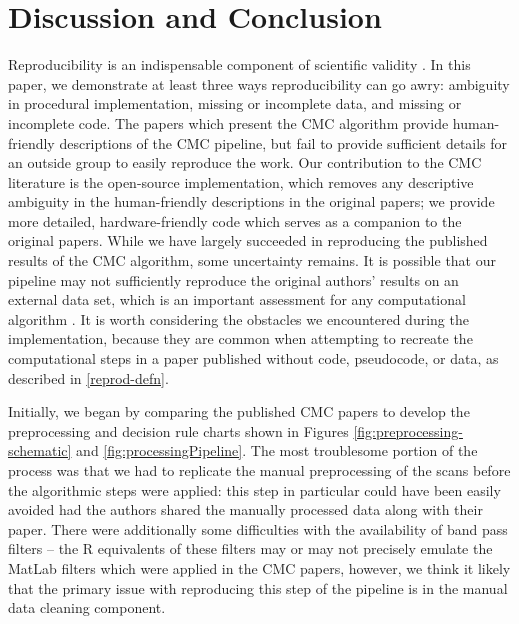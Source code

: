 \hypertarget{discussion}{%
\section{Discussion and Conclusion}\label{discussion}}

Reproducibility is an indispensable component of scientific validity
\citep{goodman_what_2016}. In this paper, we demonstrate at least three
ways reproducibility can go awry: ambiguity in procedural
implementation, missing or incomplete data, and missing or incomplete
code. The papers which present the CMC algorithm provide human-friendly
descriptions of the CMC pipeline, but fail to provide sufficient details
for an outside group to easily reproduce the work. Our contribution to
the CMC literature is the open-source implementation, which removes any
descriptive ambiguity in the human-friendly descriptions in the original
papers; we provide more detailed, hardware-friendly code which serves as
a companion to the original papers. While we have largely succeeded in
reproducing the published results of the CMC algorithm, some uncertainty
remains. It is possible that our pipeline may not sufficiently reproduce
the original authors' results on an external data set, which is an
important assessment for any computational algorithm
\citep{vanderplasComparisonThreeSimilarity2020}. It is worth considering
the obstacles we encountered during the implementation, because they are
common when attempting to recreate the computational steps in a paper
published without code, pseudocode, or data, as described in
\ref{reprod-defn}.

Initially, we began by comparing the published CMC papers to develop the
preprocessing and decision rule charts shown in Figures
\ref{fig:preprocessing-schematic} and \ref{fig:processingPipeline}. The
most troublesome portion of the process was that we had to replicate the
manual preprocessing of the scans before the algorithmic steps were
applied: this step in particular could have been easily avoided had the
authors shared the manually processed data along with their paper. There
were additionally some difficulties with the availability of band pass
filters -- the R equivalents of these filters may or may not precisely
emulate the MatLab filters which were applied in the CMC papers,
however, we think it likely that the primary issue with reproducing this
step of the pipeline is in the manual data cleaning component.

